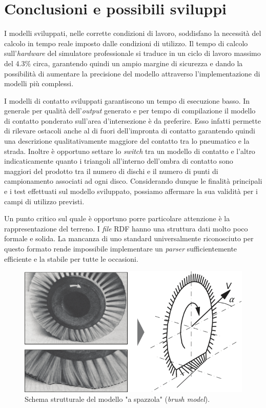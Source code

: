\chapter{Conclusioni e possibili sviluppi}
\label{Conclusione}
%
I modelli sviluppati, nelle corrette condizioni di lavoro, soddisfano la necessità del calcolo in tempo reale imposto dalle condizioni di utilizzo. Il tempo di calcolo sull'\textit{hardware} del simulatore professionale si traduce in un ciclo di lavoro massimo del 4.3\% circa, garantendo quindi un ampio margine di sicurezza e dando la possibilità di aumentare la precisione del modello attraverso l'implementazione di modelli più complessi.

I modelli di contatto sviluppati garantiscono un tempo di esecuzione basso. In generale per qualità dell'\textit{output} generato e per tempo di compilazione il modello di contatto ponderato sull'area d'intersezione è da preferire. Esso infatti permette di rilevare ostacoli anche al di fuori dell'impronta di contatto garantendo quindi una descrizione qualitativamente maggiore del contatto tra lo pneumatico e la strada. Inoltre è opportuno settare lo \textit{switch} tra un modello di contatto e l'altro indicaticamente quanto i triangoli all'interno dell'ombra di contatto sono maggiori del prodotto tra il numero di dischi e il numero di punti di campionamento associati ad ogni disco. Considerando dunque le finalità principali e i test effettuati sul modello sviluppato, possiamo affermare la sua validità per i campi di utilizzo previsti.

Un punto critico sul quale è opportuno porre particolare attenzione è la rappresentazione del terreno. I \textit{file} \ac{RDF} hanno una struttura dati molto poco formale e solida. La mancanza di uno standard universalmente riconosciuto per questo formato rende impossibile implementare un \textit{parser} sufficientemente efficiente e la stabile per tutte le occasioni.

\begin{figure}
	\centering
	\includegraphics[width=0.7\linewidth]{Figures/brush_model}
	\caption{Schema strutturale del modello "a spazzola" (\textit{brush model}). }
	\label{brushmodel}
\end{figure}

